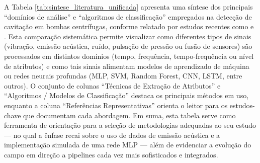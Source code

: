 \linespread{1.28}\selectfont
A Tabela \ref{tab:sintese_literatura_unificada} apresenta uma síntese dos principais “domínios de análise” e “algoritmos de classificação” empregados na detecção de cavitação em bombas centrífugas, conforme relatado por estudos recentes como  e . Esta comparação sistemática permite visualizar como diferentes tipos de sinais (vibração, emissão acústica, ruído, pulsação de pressão ou fusão de sensores) são processados em distintos domínios (tempo, frequência, tempo-frequência ou nível de atributos) e como tais sinais alimentam modelos de aprendizado de máquina ou redes neurais profundas (MLP, SVM, Random Forest, CNN, LSTM, entre outros). O conjunto de colunas “Técnicas de Extração de Atributos” e “Algoritmos / Modelos de Classificação” destaca os principais métodos em uso, enquanto a coluna “Referências Representativas” orienta o leitor para os estudos-chave que documentam cada abordagem. Em suma, esta tabela serve como ferramenta de orientação para a seleção de metodologias adequadas ao seu estudo — no qual a ênfase recai sobre o uso de dados de emissão acústica e a implementação simulada de uma rede MLP — além de evidenciar a evolução do campo em direção a pipelines cada vez mais sofisticados e integrados.
\linespread{1.25}\selectfont
%
%
%
